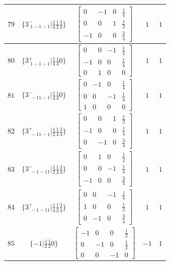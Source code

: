 \documentclass[fleqn,8pt]{jsarticle}
\begin{document}
\begin{longtable}{ccccc}
$ 79 $ & $ \{3^{-}_{\,\,1-1-1}|\frac{1}{4} \frac{1}{2} \frac{3}{4}\} $ & $ \begin{bmatrix} 0 & -1 & 0 & \frac{1}{4} \\ 0 & 0 & 1 & \frac{1}{2} \\ -1 & 0 & 0 & \frac{3}{4} \end{bmatrix} $ & $ 1 $ & $ 1 $ \\ \hline
$ 80 $ & $ \{3^{+}_{\,\,1-1-1}|\frac{1}{4} \frac{1}{4} 0\} $ & $ \begin{bmatrix} 0 & 0 & -1 & \frac{1}{4} \\ -1 & 0 & 0 & \frac{1}{4} \\ 0 & 1 & 0 & 0 \end{bmatrix} $ & $ 1 $ & $ 1 $ \\ \hline
$ 81 $ & $ \{3^{-}_{\,\,-11-1}|\frac{1}{4} \frac{1}{4} 0\} $ & $ \begin{bmatrix} 0 & -1 & 0 & \frac{1}{4} \\ 0 & 0 & -1 & \frac{1}{4} \\ 1 & 0 & 0 & 0 \end{bmatrix} $ & $ 1 $ & $ 1 $ \\ \hline
$ 82 $ & $ \{3^{+}_{\,\,-11-1}|\frac{1}{2} \frac{1}{4} \frac{3}{4}\} $ & $ \begin{bmatrix} 0 & 0 & 1 & \frac{1}{2} \\ -1 & 0 & 0 & \frac{1}{4} \\ 0 & -1 & 0 & \frac{3}{4} \end{bmatrix} $ & $ 1 $ & $ 1 $ \\ \hline
$ 83 $ & $ \{3^{-}_{\,\,-1-11}|\frac{1}{2} \frac{1}{4} \frac{3}{4}\} $ & $ \begin{bmatrix} 0 & 1 & 0 & \frac{1}{2} \\ 0 & 0 & -1 & \frac{1}{4} \\ -1 & 0 & 0 & \frac{3}{4} \end{bmatrix} $ & $ 1 $ & $ 1 $ \\ \hline
$ 84 $ & $ \{3^{+}_{\,\,-1-11}|\frac{1}{4} \frac{1}{2} \frac{3}{4}\} $ & $ \begin{bmatrix} 0 & 0 & -1 & \frac{1}{4} \\ 1 & 0 & 0 & \frac{1}{2} \\ 0 & -1 & 0 & \frac{3}{4} \end{bmatrix} $ & $ 1 $ & $ 1 $ \\ \hline
$ 85 $ & $ \{-1|\frac{1}{2} \frac{1}{2} 0\} $ & $ \begin{bmatrix} -1 & 0 & 0 & \frac{1}{2} \\ 0 & -1 & 0 & \frac{1}{2} \\ 0 & 0 & -1 & 0 \end{bmatrix} $ & $ -1 $ & $ 1 $ \\ \hline

\end{longtable}
\end{document}
